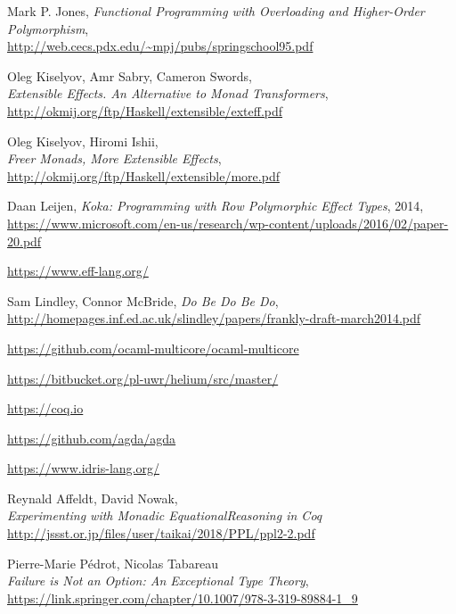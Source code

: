 \documentclass[declaration,inz,english,shortabstract]{iithesis}
\begin{document}
\begin{thebibliography}{1}
        Mark P. Jones,
        \textit{Functional Programming with Overloading and Higher-Order Polymorphism}, \\
        \url{http://web.cecs.pdx.edu/~mpj/pubs/springschool95.pdf}

        Oleg Kiselyov, Amr Sabry, Cameron Swords, \\
        \textit{Extensible Effects. An Alternative to Monad Transformers}, \\
        \url{http://okmij.org/ftp/Haskell/extensible/exteff.pdf}

        Oleg Kiselyov, Hiromi Ishii, \\
        \textit{Freer Monads, More Extensible Effects}, \\
        \url{http://okmij.org/ftp/Haskell/extensible/more.pdf}

        Daan Leijen,
        \textit{Koka: Programming with Row Polymorphic Effect Types}, 2014, \\
        \url{https://www.microsoft.com/en-us/research/wp-content/uploads/2016/02/paper-20.pdf}

        \url{https://www.eff-lang.org/}

        Sam Lindley, Connor McBride, \textit{Do Be Do Be Do}, \\
        \url{http://homepages.inf.ed.ac.uk/slindley/papers/frankly-draft-march2014.pdf}

        \url{https://github.com/ocaml-multicore/ocaml-multicore}
        
        \url{https://bitbucket.org/pl-uwr/helium/src/master/}

        \url{https://coq.io}

        \url{https://github.com/agda/agda}

        \url{https://www.idris-lang.org/}

        Reynald Affeldt, David Nowak, \\
        \textit{Experimenting with Monadic EquationalReasoning in Coq} \\
        \url{http://jssst.or.jp/files/user/taikai/2018/PPL/ppl2-2.pdf}

        Pierre-Marie Pédrot, Nicolas Tabareau \\
        \textit{Failure is Not an Option: An Exceptional Type Theory}, \\
        \url{https://link.springer.com/chapter/10.1007/978-3-319-89884-1_9}


\end{thebibliography}
\end{document}

